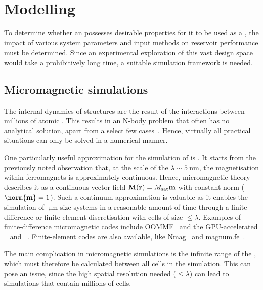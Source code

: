 \newpage
\section{Modelling}\label{sec:1:Modelling}
To determine whether an  possesses desirable properties for it to be used as a , the impact of various system parameters and input methods on reservoir performance must be determined.
Since an experimental exploration of this vast design space would take a prohibitively long time, a suitable simulation framework is needed.

\subsection{Micromagnetic simulations}
The internal  dynamics of  structures are the result of the interactions between millions of atomic .
This results in an N-body problem that often has no analytical solution, apart from a select few cases~\cite{PhD_Abert}.
Hence, virtually all practical situations can only be solved in a numerical manner. \par
One particularly useful approximation for the simulation of  is .
It starts from the previously noted observation that, at the scale of the  $\lambda \sim \SI{5}{\nano\metre}$, the magnetisation within ferromagnets is approximately continuous.
Hence, micromagnetic theory describes it as a continuous vector field $\boldsymbol{\mathbf{M}}(\boldsymbol{\mathbf{r}}) = M_\mathrm{sat} \boldsymbol{\mathbf{m}}$ with constant norm ($\norm{\vc{m}} = 1$).
Such a continuum approximation is valuable as it enables the simulation of $\SI{}{\micro\metre}$-size systems in a reasonable amount of time through a finite-difference or finite-element discretisation with cells of size $\leq \lambda$.
Examples of finite-difference micromagnetic codes include OOMMF~\cite{OOMMF} and the GPU-accelerated \mumax~\cite{mumax3} and \mumaxplus~\cite{MOR-24}.
Finite-element codes are also available, like Nmag~\cite{Nmag} and magnum.fe~\cite{magnumFE}. \par %
The main complication in micromagnetic simulations is the infinite range of the , which must therefore be calculated between all cells in the simulation.
This can pose an issue, since the high spatial resolution needed ($\leq \lambda$) can lead to simulations that contain millions of cells.
